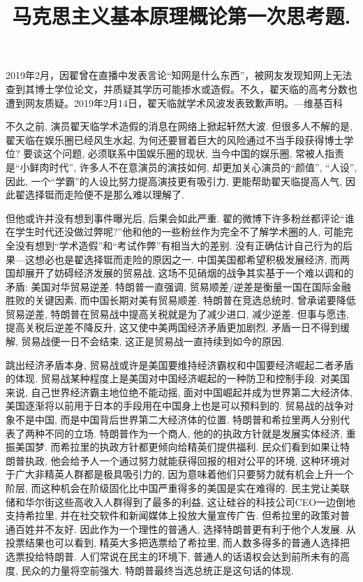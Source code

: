 \documentclass[UTF8,9pt]{ctexart}
\title{马克思主义基本原理概论第一次思考题.}
\begin{document}
 
\maketitle
{}
2019年2月，因翟曾在直播中发表言论“知网是什么东西”，被网友发现知网上无法查到其博士学位论文，并质疑其学历可能掺水或造假。不久，翟天临的高考分数也遭到网友质疑。2019年2月14日，翟天临就学术风波发表致歉声明。---维基百科

不久之前, 演员翟天临学术造假的消息在网络上掀起轩然大波. 但很多人不解的是, 翟天临在娱乐圈已经风生水起, 为何还要冒着巨大的风险通过不当手段获得博士学位? 要谈这个问题, 必须联系中国娱乐圈的现状, 当今中国的娱乐圈, 常被人指责是``小鲜肉时代'', 许多人不在意演员的演技如何, 却更加关心演员的``颜值'', ``人设'', 因此, 一个``学霸''的人设比努力提高演技更有吸引力, 更能帮助翟天临提高人气, 因此翟选择铤而走险便不是那么难以理解了. 

但他或许并没有想到事件曝光后, 后果会如此严重. 翟的微博下许多粉丝都评论``谁在学生时代还没做过弊呢?''他和他的一些粉丝作为完全不了解学术圈的人, 可能完全没有想到``学术造假''和``考试作弊''有相当大的差别. 没有正确估计自己行为的后果---这想必也是翟选择铤而走险的原因之一.
中国美国都希望积极发展经济, 而两国却展开了妨碍经济发展的贸易战, 这场不见硝烟的战争其实基于一个难以调和的矛盾: 美国对华贸易逆差. 特朗普一直强调, 贸易顺差/逆差是衡量一国在国际金融胜败的关键因素, 而中国长期对美有贸易顺差. 特朗普在竞选总统时, 曾承诺要降低贸易逆差, 特朗普在贸易战中提高关税就是为了减少进口, 减少逆差.  但事与愿违, 提高关税后逆差不降反升, 这又使中美两国经济矛盾更加剧烈, 矛盾一日不得到缓解, 贸易战便一日不会结束, 这正是贸易战一直持续到如今的原因. 

跳出经济矛盾本身, 贸易战或许是美国要维持经济霸权和中国要经济崛起二者矛盾的体现. 贸易战某种程度上是美国对中国经济崛起的一种防卫和控制手段. 对美国来说, 自己世界经济霸主地位绝不能动摇, 面对中国崛起并成为世界第二大经济体, 美国逐渐将以前用于日本的手段用在中国身上也是可以预料到的. 贸易战的战争对象不是中国, 而是中国背后世界第二大经济体的位置. 
特朗普和希拉里两人分别代表了两种不同的立场. 特朗普作为一个商人, 他的的执政方针就是发展实体经济, 重振美国梦. 而希拉里的执政方针都更倾向给精英们提供福利. 民众们看到如果让特朗普执政, 他会给予人一个通过努力就能获得回报的相对公平的环境, 这种环境对于广大非精英人群都是极具吸引力的, 因为意味着他们只要努力就有机会上升一个阶层, 而这种机会在阶级固化比中国严重得多的美国是实在难得的. 民主党让美联储和华尔街这些高收入人群得到了最多的利益, 这让硅谷的科技公司CEO一边倒地支持希拉里, 并在社交软件和新闻媒体上投放大量宣传广告. 但希拉里的政策对普通百姓并不友好. 因此作为一个理性的普通人, 选择特朗普更有利于他个人发展. 从投票结果也可以看到, 精英大多把选票给了希拉里, 而人数多得多的普通人选择把选票投给特朗普. 人们常说在民主的环境下, 普通人的话语权会达到前所未有的高度, 民众的力量将空前强大. 特朗普最终当选总统正是这句话的体现. 
\end{document}
